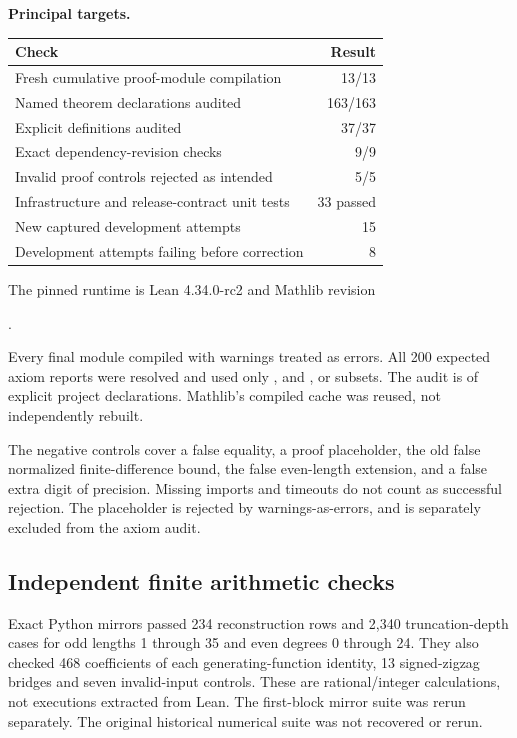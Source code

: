 \textbf{Principal targets.}\par
{}\par
{}\par
{}\par
{}
\par\medskip
{}
\begin{center}
\begin{tabular}{@{}p{}r@{}}
\toprule
Check & Result\\\midrule
Fresh cumulative proof-module compilation & 13/13\\
Named theorem declarations audited & 163/163\\
Explicit definitions audited & 37/37\\
Exact dependency-revision checks & 9/9\\
Invalid proof controls rejected as intended & 5/5\\
Infrastructure and release-contract unit tests & 33 passed\\
New captured development attempts & 15\\
Development attempts failing before correction & 8\\\bottomrule
\end{tabular}
\end{center}
The pinned runtime is Lean 4.34.0-rc2 and Mathlib revision
\begin{center}\footnotesize{}.\end{center}
Every final module compiled with warnings treated as errors. All 200 expected axiom reports were resolved and used only ,  and , or subsets. The audit is of explicit project declarations. Mathlib's compiled cache was reused, not independently rebuilt.

The negative controls cover a false equality, a proof placeholder, the old false normalized finite-difference bound, the false even-length extension, and a false extra digit of precision. Missing imports and timeouts do not count as successful rejection. The placeholder is rejected by warnings-as-errors, and  is separately excluded from the axiom audit.

\subsection*{Independent finite arithmetic checks}
Exact Python mirrors passed 234 reconstruction rows and 2,340 truncation-depth cases for odd lengths 1 through 35 and even degrees 0 through 24. They also checked 468 coefficients of each generating-function identity, 13 signed-zigzag bridges and seven invalid-input controls. These are rational/integer calculations, not executions extracted from Lean. The first-block mirror suite was rerun separately. The original historical numerical suite was not recovered or rerun.

